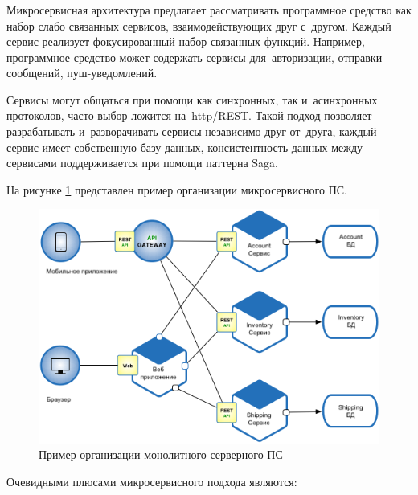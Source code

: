 \subsubsection {}
\label{sec:analysis:research:backArch:microservices}

Микросервисная архитектура предлагает рассматривать программное средство как набор слабо связанных сервисов, взаимодействующих друг с~другом. Каждый сервис реализует фокусированный набор связанных функций. Например, программное средство может содержать сервисы для~авторизации, отправки сообщений, пуш-уведомлений.

Сервисы могут общаться при помощи как синхронных, так и~асинхронных протоколов, часто выбор ложится на~\gls{http}/REST. Такой подход позволяет разрабатывать и~разворачивать сервисы независимо друг от~друга, каждый сервис имеет собственную базу данных, консистентность данных между сервисами поддерживается при помощи паттерна Saga\cite{microservices:ms}.

На рисунке \ref{sec:analysis:research:arch:back:micro} представлен пример организации микросервисного ПС.

\begin{figure}[h]
  \centering
    \includegraphics[width=1\textwidth]{inc/img/backend-micro.png}
  \caption{Пример организации монолитного серверного ПС}
  \label{sec:analysis:research:arch:back:micro}
\end{figure}

Очевидными плюсами микросервисного подхода являются:

